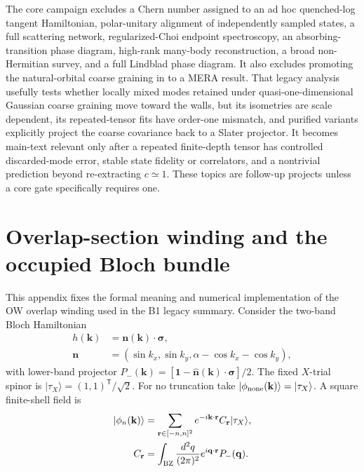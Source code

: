 \documentclass[aps,prx,twocolumn,floatfix,nofootinbib,superscriptaddress,longbibliography]{revtex4-2}
\begin{document}
The core campaign excludes a Chern number assigned to an ad hoc quenched-log tangent
Hamiltonian, polar-unitary alignment of independently sampled states, a full scattering
network, regularized-Choi endpoint spectroscopy, an absorbing-transition phase diagram,
high-rank many-body reconstruction, a broad non-Hermitian survey, and a full Lindblad phase
diagram.  It also excludes promoting the natural-orbital coarse graining in
 to a MERA
result.  That legacy analysis usefully tests whether locally mixed modes retained under
quasi-one-dimensional Gaussian coarse graining move toward the walls, but its isometries
are scale dependent, its repeated-tensor fits have order-one mismatch, and purified
variants explicitly project the coarse covariance back to a Slater projector.  It becomes
main-text relevant only after a repeated finite-depth tensor has controlled discarded-mode
error, stable state fidelity or correlators, and a nontrivial prediction beyond
re-extracting $c\simeq1$.  These topics are follow-up projects unless a core gate
specifically requires one.

\appendix

\section{Overlap-section winding and the occupied Bloch bundle}
\label{app:overlap-winding}

This appendix fixes the formal meaning and numerical implementation of the OW overlap
winding used in the B1 legacy summary.  Consider the two-band Bloch Hamiltonian
\begin{equation}
 \begin{aligned}
 h(\mathbf{k})&=\mathbf n(\mathbf{k})\cdot\boldsymbol\sigma,\\
 \mathbf n&=(\sin k_x,\sin k_y,\alpha-\cos k_x-\cos k_y),
 \end{aligned}
 \label{eq:overlap-qwz-model}
\end{equation}
with lower-band projector
$P_-(\mathbf{k})=[\mathbf{1}-\widehat{\mathbf n}(\mathbf{k})\cdot
\boldsymbol\sigma]/2$.  The fixed $X$-trial spinor is
$|\tau_X\rangle=(1,1)^{\mathsf T}/\sqrt2$.  For no truncation take
$|\phi_{\rm none}(\mathbf{k})\rangle=|\tau_X\rangle$.  A square finite-shell field is
\begin{equation}
 \begin{aligned}
 |\phi_n(\mathbf{k})\rangle
 &=\sum_{\mathbf r\in[-n,n]^2}e^{-i\mathbf{k}\cdot\mathbf r}
 C_{\mathbf r}|\tau_X\rangle,\\
 C_{\mathbf r}
 &=\int_{\rm BZ}\frac{d^2q}{(2\pi)^2}
 e^{i\mathbf q\cdot\mathbf r}P_-(\mathbf q).
 \end{aligned}
 \label{eq:overlap-finite-shell-field}
\end{equation}
\end{document}
